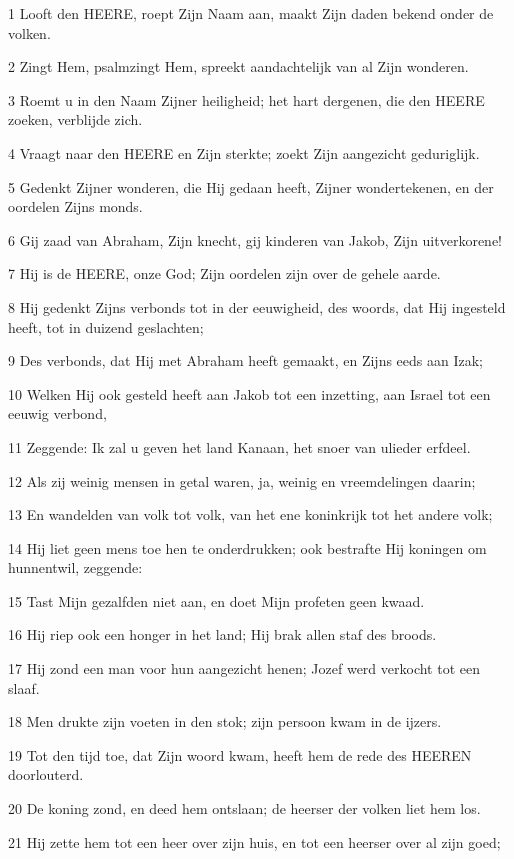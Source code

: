 \par 1 Looft den HEERE, roept Zijn Naam aan, maakt Zijn daden bekend onder de volken.
\par 2 Zingt Hem, psalmzingt Hem, spreekt aandachtelijk van al Zijn wonderen.
\par 3 Roemt u in den Naam Zijner heiligheid; het hart dergenen, die den HEERE zoeken, verblijde zich.
\par 4 Vraagt naar den HEERE en Zijn sterkte; zoekt Zijn aangezicht geduriglijk.
\par 5 Gedenkt Zijner wonderen, die Hij gedaan heeft, Zijner wondertekenen, en der oordelen Zijns monds.
\par 6 Gij zaad van Abraham, Zijn knecht, gij kinderen van Jakob, Zijn uitverkorene!
\par 7 Hij is de HEERE, onze God; Zijn oordelen zijn over de gehele aarde.
\par 8 Hij gedenkt Zijns verbonds tot in der eeuwigheid, des woords, dat Hij ingesteld heeft, tot in duizend geslachten;
\par 9 Des verbonds, dat Hij met Abraham heeft gemaakt, en Zijns eeds aan Izak;
\par 10 Welken Hij ook gesteld heeft aan Jakob tot een inzetting, aan Israel tot een eeuwig verbond,
\par 11 Zeggende: Ik zal u geven het land Kanaan, het snoer van ulieder erfdeel.
\par 12 Als zij weinig mensen in getal waren, ja, weinig en vreemdelingen daarin;
\par 13 En wandelden van volk tot volk, van het ene koninkrijk tot het andere volk;
\par 14 Hij liet geen mens toe hen te onderdrukken; ook bestrafte Hij koningen om hunnentwil, zeggende:
\par 15 Tast Mijn gezalfden niet aan, en doet Mijn profeten geen kwaad.
\par 16 Hij riep ook een honger in het land; Hij brak allen staf des broods.
\par 17 Hij zond een man voor hun aangezicht henen; Jozef werd verkocht tot een slaaf.
\par 18 Men drukte zijn voeten in den stok; zijn persoon kwam in de ijzers.
\par 19 Tot den tijd toe, dat Zijn woord kwam, heeft hem de rede des HEEREN doorlouterd.
\par 20 De koning zond, en deed hem ontslaan; de heerser der volken liet hem los.
\par 21 Hij zette hem tot een heer over zijn huis, en tot een heerser over al zijn goed;
